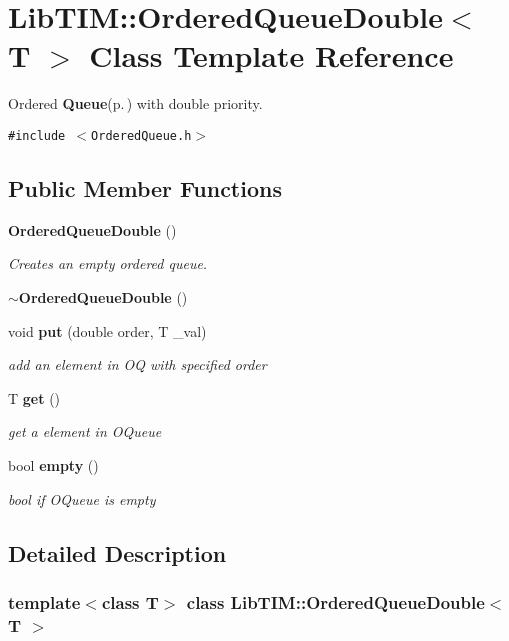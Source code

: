 \section{Lib\-TIM::Ordered\-Queue\-Double$<$ T $>$ Class Template Reference}
\label{classLibTIM_1_1OrderedQueueDouble}
Ordered {\bf Queue}{\rm (p.\,\pageref{classLibTIM_1_1Queue})} with double priority.  


{\tt \#include $<$Ordered\-Queue.h$>$}

\subsection*{Public Member Functions}
\begin{CompactItemize}
\item 
{\bf Ordered\-Queue\-Double} ()
\begin{CompactList}\small\item\em Creates an empty ordered queue. \item\end{CompactList}\item 
{\bf $\sim$Ordered\-Queue\-Double} ()
\item 
void {\bf put} (double order, T \_\-val)
\begin{CompactList}\small\item\em add an element in OQ with specified order \item\end{CompactList}\item 
T {\bf get} ()
\begin{CompactList}\small\item\em get a element in OQueue \item\end{CompactList}\item 
bool {\bf empty} ()
\begin{CompactList}\small\item\em bool if OQueue is empty \item\end{CompactList}\end{CompactItemize}


\subsection{Detailed Description}
\subsubsection*{template$<$class T$>$ class Lib\-TIM::Ordered\-Queue\-Double$<$ T $>$}

